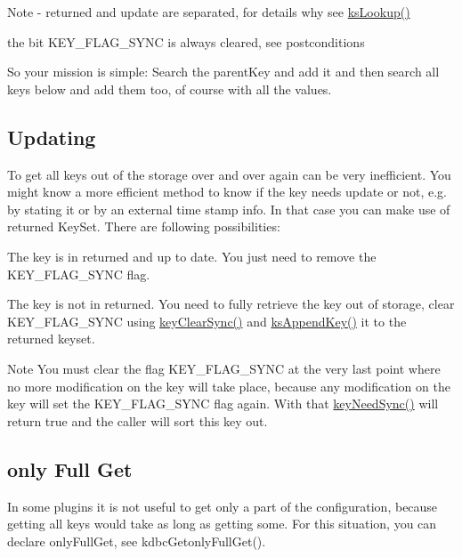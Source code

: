 \begin{DoxyNote}{Note}
-\/ returned and update are separated, for details why see \hyperlink{group__keyset_gaa34fc43a081e6b01e4120daa6c112004}{ksLookup()}
\begin{DoxyItemize}
\item the bit KEY\_\-FLAG\_\-SYNC is always cleared, see postconditions
\end{DoxyItemize}
\end{DoxyNote}
So your mission is simple: Search the {\ttfamily parentKey} and add it and then search all keys below and add them too, of course with all the values.\hypertarget{group__plugin_updating}{}\subsection{Updating}\label{group__plugin_updating}
To get all keys out of the storage over and over again can be very inefficient. You might know a more efficient method to know if the key needs update or not, e.g. by stating it or by an external time stamp info. In that case you can make use of {\ttfamily returned} KeySet. There are following possibilities:
\begin{DoxyItemize}
\item The key is in returned and up to date. You just need to remove the KEY\_\-FLAG\_\-SYNC flag.
\item The key is not in returned. You need to fully retrieve the key out of storage, clear KEY\_\-FLAG\_\-SYNC using \hyperlink{group__keytest_ga6a994eebd4b1c253d4912fa80df16506}{keyClearSync()} and \hyperlink{group__keyset_gaa5a1d467a4d71041edce68ea7748ce45}{ksAppendKey()} it to the {\ttfamily returned} keyset.
\end{DoxyItemize}

\begin{DoxyNote}{Note}
You must clear the flag KEY\_\-FLAG\_\-SYNC at the very last point where no more modification on the key will take place, because any modification on the key will set the KEY\_\-FLAG\_\-SYNC flag again. With that \hyperlink{group__keytest_gaf247df0de7aca04b32ef80e39ef12950}{keyNeedSync()} will return true and the caller will sort this key out.
\end{DoxyNote}
\hypertarget{group__plugin_fullget}{}\subsection{only Full Get}\label{group__plugin_fullget}
In some plugins it is not useful to get only a part of the configuration, because getting all keys would take as long as getting some. For this situation, you can declare onlyFullGet, see kdbcGetonlyFullGet().

